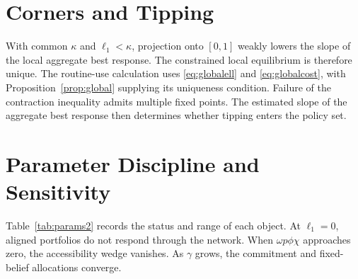 \documentclass[11pt]{article}
\theoremstyle{definition}
\begin{document}
\section{Corners and Tipping}\label{app:corners}

With common $\kappa$ and $\ell_1<\kappa$, projection onto $[0,1]$ weakly lowers the slope of the local aggregate best response. The constrained local equilibrium is therefore unique. The routine-use calculation uses \eqref{eq:globalell} and \eqref{eq:globalcost}, with Proposition~\ref{prop:global} supplying its uniqueness condition. Failure of the contraction inequality admits multiple fixed points. The estimated slope of the aggregate best response then determines whether tipping enters the policy set.

\section{Parameter Discipline and Sensitivity}\label{app:params}

Table~\ref{tab:params2} records the status and range of each object. At $\ell_1=0$, aligned portfolios do not respond through the network. When $\omega p\phi\chi$ approaches zero, the accessibility wedge vanishes. As $\gamma$ grows, the commitment and fixed-belief allocations converge.
\end{document}
